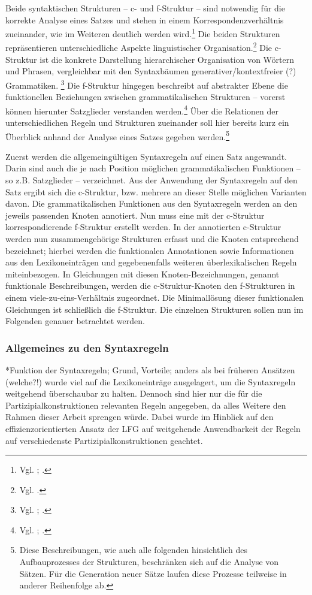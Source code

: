 \documentclass[12pt,a4paper]{article}
\begin{document}
Beide syntaktischen Strukturen -- c- und f-Struktur -- sind notwendig für die korrekte Analyse eines Satzes und stehen in einem Korrespondenzverhältnis zueinander, wie im Weiteren deutlich werden wird.\footnote{Vgl. \cite[3]{Dal}; \cite[4]{Skript}.} Die beiden Strukturen repräsentieren unterschiedliche Aspekte linguistischer Organisation.\footnote{Vgl. \cite[1]{Dal}.} Die c-Struktur ist die konkrete Darstellung hierarchischer Organisation von Wörtern und Phrasen, vergleichbar mit den Syntaxbäumen generativer/kontextfreier (?) Grammatiken. \footnote{Vgl. \cite[7]{Dal}; \cite[13]{Rohrer}.} Die f-Struktur hingegen beschreibt auf abstrakter Ebene die funktionellen Beziehungen zwischen grammatikalischen Strukturen -- vorerst können hierunter Satzglieder verstanden werden.\footnote{Vgl. \cite[7]{Dal}; \cite[4]{Skript}.} Über die Relationen der unterschiedlichen Regeln und Strukturen zueinander soll hier bereits kurz ein Überblick anhand der Analyse eines Satzes gegeben werden.\footnote{Diese Beschreibungen, wie auch alle folgenden hinsichtlich des Aufbauprozesses der Strukturen, beschränken sich auf die Analyse von Sätzen. Für die Generation neuer Sätze laufen diese Prozesse teilweise in anderer Reihenfolge ab.}

Zuerst werden die allgemeingültigen Syntaxregeln auf einen Satz angewandt. Darin sind auch die je nach Position möglichen grammatikalischen Funktionen -- so z.B. Satzglieder -- verzeichnet. Aus der Anwendung der Syntaxregeln auf den Satz ergibt sich die c-Struktur, bzw. mehrere an dieser Stelle möglichen Varianten davon. Die grammatikalischen Funktionen aus den Syntaxregeln werden an den jeweils passenden Knoten annotiert. Nun muss eine mit der c-Struktur korrespondierende f-Struktur erstellt werden. In der annotierten c-Struktur werden nun zusammengehörige Strukturen erfasst und die Knoten entsprechend bezeichnet; hierbei werden die funktionalen Annotationen sowie Informationen aus den Lexikoneinträgen und gegebenenfalls weiteren überlexikalischen Regeln miteinbezogen. In Gleichungen mit diesen Knoten-Bezeichnungen, genannt funktionale Beschreibungen, werden die c-Struktur-Knoten den f-Strukturen in einem viele-zu-eins-Verhältnis zugeordnet. Die Minimallösung dieser funktionalen Gleichungen ist schließlich die f-Struktur.
Die einzelnen Strukturen sollen nun im Folgenden genauer betrachtet werden.

\subsubsection{Allgemeines zu den Syntaxregeln}
*Funktion der Syntaxregeln; Grund, Vorteile; anders als bei früheren Ansätzen (welche?!) wurde viel auf die Lexikoneinträge ausgelagert, um die Syntaxregeln weitgehend überschaubar zu halten. Dennoch sind hier nur die für die Partizipialkonstruktionen relevanten Regeln angegeben, da alles Weitere den Rahmen dieser Arbeit sprengen würde. Dabei wurde im Hinblick auf den effizienzorientierten Ansatz der LFG auf weitgehende Anwendbarkeit der Regeln auf verschiedenste Partizipialkonstruktionen geachtet. \\
\end{document}
